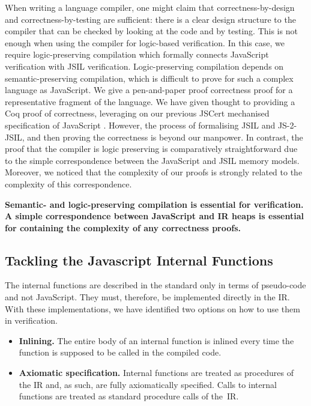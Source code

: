 \documentclass{llncs}
\newcommand{\jsil}{JSIL\xspace}
\newcommand{\JSComp}{JS-2-JSIL\xspace}
\begin{document}
When writing a language compiler, one 
 might claim that correctness-by-design and
correctness-by-testing are sufficient: there is a clear design
structure to the compiler that can be checked by looking at the code
and by testing. 
This is not enough when using the compiler
for logic-based verification. In this case, we 
require logic-preserving  compilation which formally connects 
JavaScript verification with \jsil verification. Logic-preserving
compilation depends on semantic-preserving compilation, 
which is difficult to prove for such a complex language as
JavaScript. We give a pen-and-paper proof correctness proof for a
representative fragment of the language. 
We have given thought to providing a Coq proof of correctness,
leveraging on our previous
JSCert mechanised specification of JavaScript \cite{bodin:popl:2014}.
However, the process of formalising \jsil and \JSComp, and then proving the
correctness is beyond our manpower.
In contrast, the proof that the compiler
is logic preserving is comparatively straightforward
due to the simple correspondence between the JavaScript and \jsil
memory models. Moreover, we noticed that the complexity of our proofs 
is strongly related to the complexity of this correspondence. 



\begin{center}
{\bfseries \small
Semantic- and logic-preserving compilation is essential for verification.\\
A simple correspondence between JavaScript and IR heaps is essential
for containing the complexity of any correctness proofs.
}
\end{center}

\subsection{Tackling the Javascript Internal Functions}

The internal functions are described in the standard only in terms of
pseudo-code and not JavaScript.
They must, therefore, be implemented directly in the IR. With these implementations, we have identified two options on how to use them in verification.
\begin{itemize}
\setlength{\itemsep}{0.5em}
\item {\bfseries Inlining.} The entire body of an internal function is inlined every time the function is supposed to be called in the compiled code.
\item {\bfseries Axiomatic specification.} Internal functions are treated as procedures of the IR and, as such, are fully axiomatically specified. Calls to internal functions are treated as standard procedure calls of the~IR.
\end{itemize}
\end{document}
